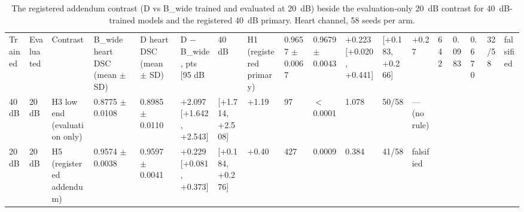 \begin{table}[t]
\caption{The registered addendum contrast (D vs B\_wide trained and evaluated at 20~dB) beside the evaluation-only 20~dB contrast for 40~dB-trained models and the registered 40~dB primary. Heart channel, 58 seeds per arm.}
\label{tab:retrained}
\centering\small
\begin{tabular}{lllllllllllll}
\hline
Trained & Evaluated & Contrast & B\_wide heart DSC (mean $\pm$ SD) & D heart DSC (mean $\pm$ SD) & D $-$ B\_wide, pts [95%
 dB & 40 dB & H1 (registered primary) & 0.9657 $\pm$ 0.0067 & 0.9679 $\pm$ 0.0043 & +0.223 [+0.020, +0.441] & [+0.183, +0.266] & +0.27 & 642 & 0.0983 & 0.670 & 32/58 & falsified \\
40 dB & 20 dB & H3 low end (evaluation only) & 0.8775 $\pm$ 0.0108 & 0.8985 $\pm$ 0.0110 & +2.097 [+1.642, +2.543] & [+1.714, +2.508] & +1.19 & 97 & $<$0.0001 & 1.078 & 50/58 & — (no rule) \\
20 dB & 20 dB & H5 (registered addendum) & 0.9574 $\pm$ 0.0038 & 0.9597 $\pm$ 0.0041 & +0.229 [+0.081, +0.373] & [+0.184, +0.276] & +0.40 & 427 & 0.0009 & 0.384 & 41/58 & falsified \\
\hline
\end{tabular}
\end{table}
